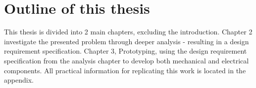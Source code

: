 \section{Outline of this thesis}
This thesis is divided into 2 main chapters, excluding the introduction. Chapter 2 investigate the presented problem through deeper analysis - resulting in a design requirement specification. Chapter 3, Prototyping, using the design requirement specification from the analysis chapter to develop both mechanical and electrical components. All practical information for replicating this work is located in the appendix.



